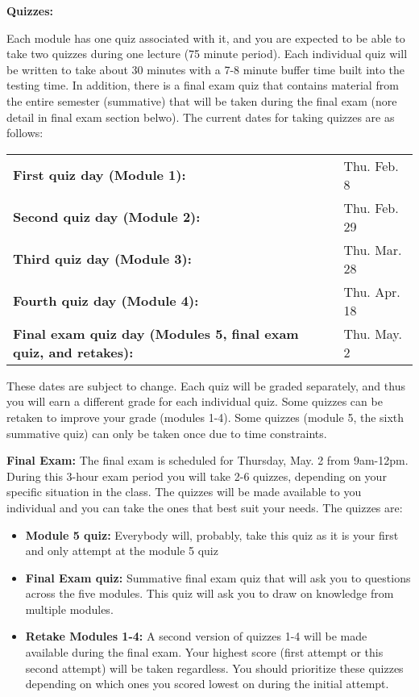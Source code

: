 \documentclass[12pt]{article}
\begin{document}
\textbf{Quizzes:} 

Each module has one quiz associated with it, and you are expected to be able to take two quizzes during one lecture (75 minute period). Each individual quiz will be written to take about 30 minutes with a 7-8 minute buffer time built into the testing time. In addition, there is a final exam quiz that contains material from the entire semester (summative) that will be taken during the final exam (nore detail in final exam section belwo). The current dates for taking quizzes are as follows:

\begin{tabular}{ll}
\textbf{First quiz day (Module 1):} & Thu. Feb. 8 \\
\textbf{Second quiz day (Module 2):} & Thu. Feb. 29 \\
\textbf{Third quiz day (Module 3):} & Thu. Mar. 28 \\
\textbf{Fourth quiz day (Module 4):} & Thu. Apr. 18 \\
\textbf{Final exam quiz day (Modules 5, final exam quiz, and retakes):} & Thu. May. 2 \\
\end{tabular}

These dates are subject to change. Each quiz will be graded separately, and thus you will earn a different grade for each individual quiz. Some quizzes can be retaken to improve your grade (modules 1-4). Some quizzes (module 5, the sixth summative quiz) can only be taken once due to time constraints.

\textbf{Final Exam:} The final exam is scheduled for Thursday, May. 2 from 9am-12pm. During this 3-hour exam period you will take 2-6 quizzes, depending on your specific situation in the class. The quizzes will be made available to you individual and you can take the ones that best suit your needs. The quizzes are:

\begin{itemize}
\item  \textbf{Module 5 quiz:} Everybody will, probably, take this quiz as it is your first and only attempt at the module 5 quiz
\item \textbf{Final Exam quiz:} Summative final exam quiz that will ask you to questions across the five modules. This quiz will ask you to draw on knowledge from multiple modules.
\item \textbf{Retake Modules 1-4:} A second version of quizzes 1-4 will be made available during the final exam. Your highest score (first attempt or this second attempt) will be taken regardless. You should prioritize these quizzes depending on which ones you scored lowest on during the initial attempt.
\end{itemize}
\end{document}
